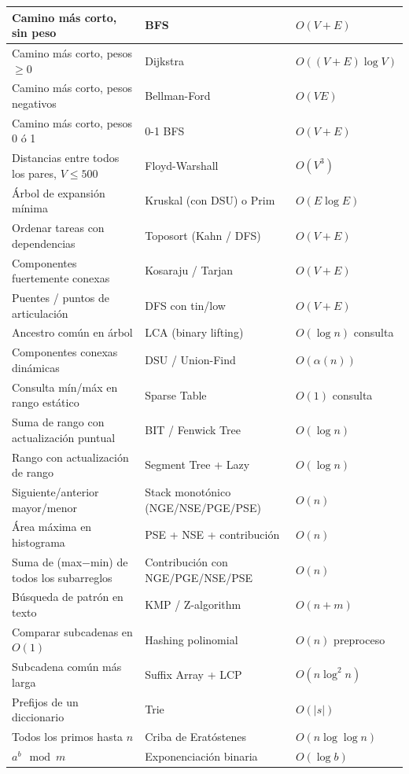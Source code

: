 \documentclass[10pt,a4paper]{article}
\begin{document}
\begin{center}
\begin{longtable}{|p{6.5cm}|p{6.5cm}|p{3cm}|}
Camino m\'as corto, sin peso & BFS & $O(V+E)$ \\
\hline
Camino m\'as corto, pesos $\geq 0$ & Dijkstra & $O((V+E)\log V)$ \\
\hline
Camino m\'as corto, pesos negativos & Bellman-Ford & $O(VE)$ \\
\hline
Camino m\'as corto, pesos 0 \'o 1 & 0-1 BFS & $O(V+E)$ \\
\hline
Distancias entre todos los pares, $V \leq 500$ & Floyd-Warshall & $O(V^3)$ \\
\hline
\'Arbol de expansi\'on m\'inima & Kruskal (con DSU) o Prim & $O(E \log E)$ \\
\hline
Ordenar tareas con dependencias & Toposort (Kahn / DFS) & $O(V+E)$ \\
\hline
Componentes fuertemente conexas & Kosaraju / Tarjan & $O(V+E)$ \\
\hline
Puentes / puntos de articulaci\'on & DFS con tin/low & $O(V+E)$ \\
\hline
Ancestro com\'un en \'arbol & LCA (binary lifting) & $O(\log n)$ consulta \\
\hline
Componentes conexas din\'amicas & DSU / Union-Find & $O(\alpha(n))$ \\
\hline
Consulta m\'in/m\'ax en rango est\'atico & Sparse Table & $O(1)$ consulta \\
\hline
Suma de rango con actualizaci\'on puntual & BIT / Fenwick Tree & $O(\log n)$ \\
\hline
Rango con actualizaci\'on de rango & Segment Tree + Lazy & $O(\log n)$ \\
\hline
Siguiente/anterior mayor/menor & Stack monot\'onico (NGE/NSE/PGE/PSE) & $O(n)$ \\
\hline
\'Area m\'axima en histograma & PSE + NSE + contribuci\'on & $O(n)$ \\
\hline
Suma de (max$-$min) de todos los subarreglos & Contribuci\'on con NGE/PGE/NSE/PSE & $O(n)$ \\
\hline
B\'usqueda de patr\'on en texto & KMP / Z-algorithm & $O(n+m)$ \\
\hline
Comparar subcadenas en $O(1)$ & Hashing polinomial & $O(n)$ preproceso \\
\hline
Subcadena com\'un m\'as larga & Suffix Array + LCP & $O(n \log^2 n)$ \\
\hline
Prefijos de un diccionario & Trie & $O(|s|)$ \\
\hline
Todos los primos hasta $n$ & Criba de Erat\'ostenes & $O(n \log \log n)$ \\
\hline
$a^b \mod m$ & Exponenciaci\'on binaria & $O(\log b)$ \\

\end{longtable}
\end{center}
\end{document}
